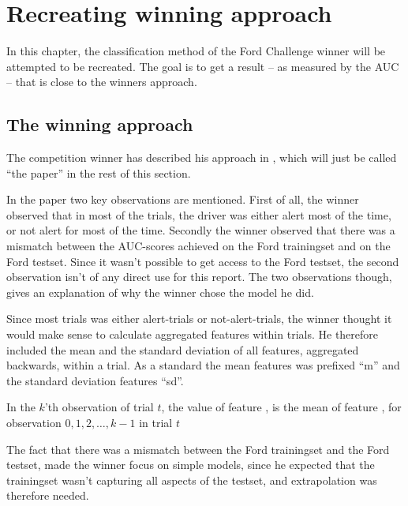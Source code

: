 \chapter{Recreating winning approach}\label{sec:recreating}
In this chapter, the classification method of the Ford Challenge winner will be attempted to be recreated. The goal is to get a result -- as measured by the AUC -- that is close to the winners approach.

\section{The winning approach}
The competition winner has described his approach in \citet{inference_winning_approach}, which will just be called ``the paper'' in the rest of this section. \par
In the paper two key observations are mentioned. First of all, the winner observed that in most of the trials, the driver was either alert most of the time, or not alert for most of the time. Secondly the winner observed that there was a mismatch between the AUC-scores achieved on the Ford trainingset and on the Ford testset. Since it wasn't possible to get access to the Ford testset, the second observation isn't of any direct use for this report. The two observations though, gives an explanation of why the winner chose the model he did. \par
Since most trials was either alert-trials or not-alert-trials, the winner thought it would make sense to calculate aggregated features within trials. He therefore included the mean and the standard deviation of all features, aggregated backwards, within a trial. As a standard the mean features was prefixed ``m'' and the standard deviation features ``sd''. 
\begin{Exa}
    In the $k$'th observation of trial $t$, the value of feature , is the mean of feature , for observation $0,1,2,\dots,k-1$ in trial $t$
\end{Exa}
The fact that there was a mismatch between the Ford trainingset and the Ford testset, made the winner focus on simple models, since he expected that the trainingset wasn't capturing all aspects of the testset, and extrapolation was therefore needed.

